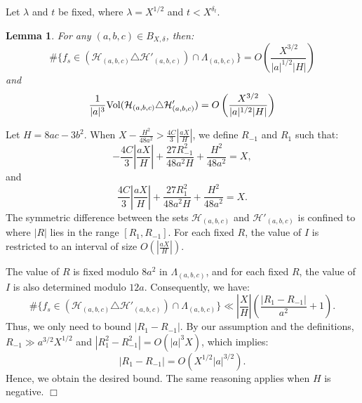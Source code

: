 \documentclass{article}
\def\Vol{{\rm Vol}}
\def\H{{\mathcal H}}
\def\H{{\mathcal H}}
\newtheorem{lemma}[theorem]{Lemma}
\newenvironment{proof}{\noindent {\bf Proof:}}{$\Box$ \vspace{2 ex}}
\begin{document}
Let $\lambda$ and $t$ be fixed, where $\lambda = X^{1/2}$ and $t < X^{\delta_t}$. 
\begin{lemma}\label{HtoH'}
    For any \( (a,b,c) \in B_{X,\delta} \), then:
    \begin{equation*}
        \#\{f_s \in (\H_{(a,b,c)} \triangle \H'_{(a,b,c)}) \cap \Lambda_{(a,b,c)}\} = O\left(\frac{X^{3/2}}{|a|^{1/2}|H|}\right)
    \end{equation*}
    and 
\begin{equation*}
    \frac{1}{|a|^3}\Vol(\H_{(a,b,c)} \triangle \H'_{(a,b,c)}) = O\left(\frac{X^{3/2}}{|a|^{1/2}|H|}\right)
\end{equation*}

    
\end{lemma}
\begin{proof}
Let $H = 8ac - 3b^2$. When $X - \frac{H^2}{48a^2} > \frac{4C}{3}\left|\frac{aX}{H}\right|$, we define $R_{-1}$ and $R_{1}$ such that:
\begin{equation*}
-\frac{4C}{3}\left|\frac{aX}{H}\right| + \frac{27R_{-1}^2}{48a^2H} + \frac{H^2}{48a^2} = X,
\end{equation*}
and
\begin{equation*}
\frac{4C}{3}\left|\frac{aX}{H}\right| + \frac{27R_{1}^2}{48a^2H} + \frac{H^2}{48a^2} = X.
\end{equation*}
The symmetric difference between the sets $\mathcal{H}_{(a,b,c)}$ and $\mathcal{H}'_{(a,b,c)}$ is confined to where $|R|$ lies in the range $[R_{1}, R_{-1}]$. For each fixed $R$, the value of $I$ is restricted to an interval of size $O\left(\left| \frac{aX}{H} \right|\right)$.  

The value of $R$ is fixed modulo $8a^2$ in $\Lambda_{(a,b,c)}$, and for each fixed $R$, the value of $I$ is also determined modulo $12a$. Consequently, we have:
\begin{equation*}
\#\big\{f_s \in (\H_{(a,b,c)} \triangle \H'_{(a,b,c)}) \cap \Lambda_{(a,b,c)}\big\} \ll \left|\frac{X}{H}\right| \left(\frac{|R_{1} - R_{-1}|}{a^2} + 1\right).
\end{equation*}
Thus, we only need to bound $|R_{1} - R_{-1}|$. By our assumption and the definitions, $R_{-1} \gg a^{3/2} X^{1/2}$ and $|R_{1}^2 - R_{-1}^2| = O(|a|^3 X)$, which implies:
\begin{equation*}
|R_{1} - R_{-1}| = O(X^{1/2} |a|^{3/2}).
\end{equation*}
Hence, we obtain the desired bound. The same reasoning applies when $H$ is negative.
\end{proof}
\end{document}
